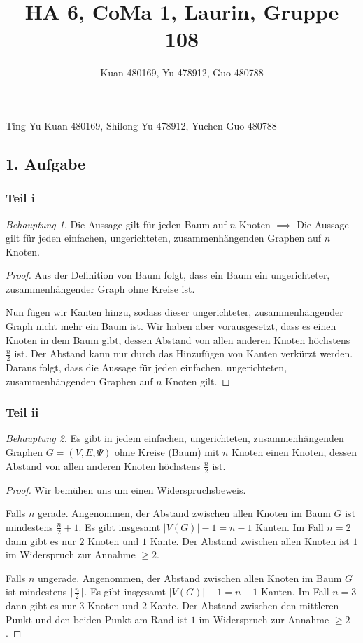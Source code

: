 \documentclass[a5paper]{article}
\title{HA 6, CoMa 1, Laurin, Gruppe 108}
\author{Kuan 480169, Yu 478912, Guo 480788}
\theoremstyle{remark}
\newtheorem*{Behauptung}{Behauptung}
\begin{document}
\maketitle
\begin{center}
Ting Yu Kuan 480169, Shilong Yu 478912, Yuchen Guo 480788
\end{center}
\newpage
\subsection{1. Aufgabe}
\subsubsection{Teil i}
\begin{Behauptung}
Die Aussage gilt für jeden Baum auf \(n\) Knoten
\(\implies\) Die Aussage gilt für jeden einfachen, ungerichteten,
zusammenhängenden Graphen auf \(n\) Knoten.
\end{Behauptung}
\begin{proof}
  Aus der Definition von Baum folgt, dass ein Baum ein ungerichteter,
  zusammenhängender Graph ohne Kreise ist.

  Nun fügen wir Kanten hinzu, sodass dieser ungerichteter,
  zusammenhängender Graph nicht mehr ein Baum ist.  Wir haben aber
  vorausgesetzt, dass es einen Knoten in dem Baum gibt, dessen Abstand
  von allen anderen Knoten höchstens \(\frac{n}{2}\) ist.  Der Abstand
  kann nur durch das Hinzufügen von Kanten verkürzt werden.  Daraus
  folgt, dass die Aussage für jeden einfachen, ungerichteten,
  zusammenhängenden Graphen auf \(n\) Knoten gilt.
\end{proof}
\subsubsection{Teil ii}
\begin{Behauptung}
  Es gibt in jedem einfachen, ungerichteten,
zusammenhängenden Graphen \(G = (V, E, \Psi)\) ohne Kreise (Baum) mit \(n\) Knoten einen
Knoten, dessen Abstand von allen anderen Knoten höchstens
\(\frac{n}{2}\) ist.
\end{Behauptung}
\begin{proof}
    Wir bemühen uns um einen Widerspruchsbeweis.

  Falls \(n\) gerade.  Angenommen, der Abstand zwischen allen Knoten im
  Baum \(G\) ist mindestens \(\frac{n}{2}+1\).  Es gibt insgesamt $\left|
    V(G) \right|-1=n-1$ Kanten. Im Fall \(n=2\) dann gibt es nur \(2\)
  Knoten und \(1\) Kante.  Der Abstand zwischen allen Knoten ist \(1\) im
  Widerspruch zur Annahme \(\geq 2\).

  Falls \(n\) ungerade.  Angenommen, der Abstand zwischen allen Knoten
  im Baum \(G\) ist mindestens \(\lceil\frac{n}{2}\rceil\). Es gibt insgesamt $\left|
    V(G) \right|-1=n-1$ Kanten. Im Fall \(n=3\) dann gibt es nur \(3\)
  Knoten und \(2\) Kante.  Der Abstand zwischen den mittleren Punkt und
  den beiden Punkt am Rand ist \(1\) im Widerspruch zur Annahme \(\geq 2\).
\end{proof}
\end{document}
